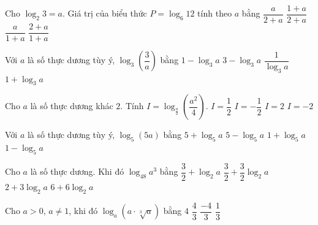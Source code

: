 \begin{ex}%
	 Cho $\log _2 3=a$. Giá trị của biểu thức $P=\log _6 12$ tính theo $a$ bằng
	\choice 
		 {$\dfrac{a}{2+a}$}
		 {$\dfrac{1+a}{2+a}$}
		{$\dfrac{a}{1+a}$} 
		{\True $\dfrac{2+a}{1+a}$} 
\end{ex}

\begin{ex}%
	Với $a$ là số thực dương tùy ý, $\log_3\left(\dfrac{3}{a}\right)$ bằng 
	 \choice
		{\True $1-\log_3a$} 
		 {$3-\log_3a$}
		{$\dfrac{1}{\log_3a}$} 
		{$1+\log_3a$} 
\end{ex}

\begin{ex}%
	Cho $a$  là số thực dương khác $2$. Tính $I=\log_{\tfrac{a}{2}}\left(\dfrac{a^{2}}{4}\right)$.
	\choice 
		{$I=\dfrac{1}{2}$} 
		{$I=-\dfrac{1}{2}$} 
		{\True  $I=2$}
		 {$I=-2$}
\end{ex}

\begin{ex}%
	Với $a$  là số thực dương tùy ý, $\log_5(5a)$ bằng
	 \choice
		 {$5+\log_5a$}
		 {$5-\log_5a$}
		 {\True $1+\log_5a$}
		 {$1-\log_5a$}
\end{ex}

\begin{ex}%
	Cho $a$ là  số thực dương. Khi đó $\log_48a^3$ bằng
	\choice 
		 {$\dfrac{3}{2}+\log_2a$}
		{\True  $\dfrac{3}{2}+\dfrac{3}{2}{\log_2}a$}
		{$2+3\log_2a$} 
		{$6+6\log_2a$} 
\end{ex}

\begin{ex}%
	Cho $a>0$, $a\ne 1$, khi đó  $\log_a\left(a\cdot \sqrt[3]{a}\right)$ bằng
	\choice 
		{$ 4$} 
		{\True $\dfrac{4}{3}$} 
		 {$\dfrac{-4}{3}$}
		{$\dfrac{1}{3}$} 
\end{ex}

